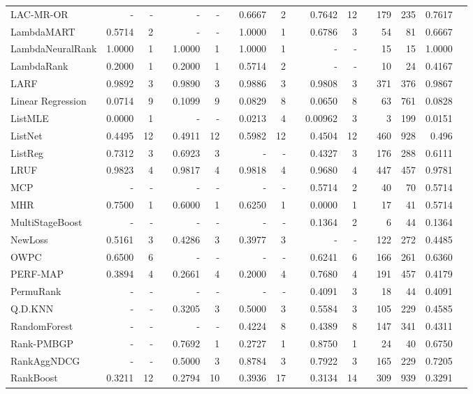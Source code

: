 \documentclass{sig-alternate}
\begin{document}
\begin{longtable}[!hp]{@{}lrrrrrrrrrrrrrrrr@{}}
LAC-MR-OR & - & - && - & - && 0.6667 & 2 && 0.7642 & 12 && 179 & 235 & 0.7617 \\
LambdaMART & 0.5714 & 2 && - & - && 1.0000 & 1 && 0.6786 & 3 && 54 & 81 & 0.6667 \\
LambdaNeuralRank & 1.0000 & 1 && 1.0000 & 1 && 1.0000 & 1 && - & - && 15 & 15 & 1.0000 \\
LambdaRank & 0.2000 & 1 && 0.2000 & 1 && 0.5714 & 2 && - & - && 10 & 24 & 0.4167 \\
LARF & 0.9892 & 3 && 0.9890 & 3 && 0.9886 & 3 && 0.9808 & 3 && 371 & 376 & 0.9867 \\
Linear Regression & 0.0714 & 9 && 0.1099 & 9 && 0.0829 & 8 && 0.0650 & 8 && 63 & 761 & 0.0828 \\
ListMLE & 0.0000 & 1 && - & - && 0.0213 & 4 && 0.00962 & 3 && 3 & 199 & 0.0151 \\
ListNet & 0.4495 & 12 && 0.4911 & 12 && 0.5982 & 12 && 0.4504 & 12 && 460 & 928 & 0.496 \\
ListReg & 0.7312 & 3 && 0.6923 & 3 && - & - && 0.4327 & 3 && 176 & 288 & 0.6111 \\
LRUF & 0.9823 & 4 && 0.9817 & 4 && 0.9818 & 4 && 0.9680 & 4 && 447 & 457 & 0.9781 \\
MCP & - & - && - & - && - & - && 0.5714 & 2 && 40 & 70 & 0.5714 \\
MHR & 0.7500 & 1 && 0.6000 & 1 && 0.6250 & 1 && 0.0000 & 1 && 17 & 41 & 0.5714 \\
MultiStageBoost & - & - && - & - && - & - && 0.1364 & 2 && 6 & 44 & 0.1364 \\
NewLoss & 0.5161 & 3 && 0.4286 & 3 && 0.3977 & 3 && - & - && 122 & 272 & 0.4485 \\
OWPC & 0.6500 & 6 && - & - && - & - && 0.6241 & 6 && 166 & 261 & 0.6360 \\
PERF-MAP & 0.3894 & 4 && 0.2661 & 4 && 0.2000 & 4 && 0.7680 & 4 && 191 & 457 & 0.4179 \\
PermuRank & - & - && - & - && - & - && 0.4091 & 3 && 18 & 44 & 0.4091 \\
Q.D.KNN & - & - && 0.3205 & 3 && 0.5000 & 3 && 0.5584 & 3 && 105 & 229 & 0.4585 \\
RandomForest & - & - && - & - && 0.4224 & 8 && 0.4389 & 8 && 147 & 341 & 0.4311 \\
Rank-PMBGP & - & - && 0.7692 & 1 && 0.2727 & 1 && 0.8750 & 1 && 24 & 40 & 0.6750 \\
RankAggNDCG & - & - && 0.5000 & 3 && 0.8784 & 3 && 0.7922 & 3 && 165 & 229 & 0.7205 \\
RankBoost & 0.3211 & 12 && 0.2794 & 10 && 0.3936 & 17 && 0.3134 & 14 && 309 & 939 & 0.3291 \\

\end{longtable}
\end{document}
